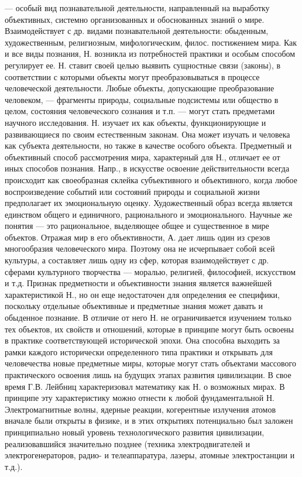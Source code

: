 \documentclass[a4paper,12pt]{article}
\begin{document}
— особый вид познавательной деятельности, направленный на выработку объективных, системно организованных и обоснованных знаний о мире. Взаимодействует с др. видами познавательной деятельности: обыденным, художественным, религиозным, мифологическим, филос. постижением мира. 
Как и все виды познания, Н. возникла из потребностей практики и особым способом регулирует ее. Н. ставит своей целью выявить сущностные связи (законы), в соответствии с которыми объекты могут преобразовываться в процессе человеческой деятельности. 
Любые объекты, допускающие преобразование человеком, — фрагменты природы, социальные подсистемы или общество в целом, состояния человеческого сознания и т.п. — могут стать предметами научного исследования. Н. изучает их как объекты, функционирующие и развивающиеся по своим естественным законам. Она может изучать и человека как субъекта деятельности, но также в качестве особого объекта. 
Предметный и объективный способ рассмотрения мира, характерный для Н., отличает ее от иных способов познания. Напр., в искусстве освоение действительности всегда происходит как своеобразная склейка субъективного и объективного, когда любое воспроизведение событий или состояний природы и социальной жизни предполагает их эмоциональную оценку. Художественный образ всегда является единством общего и единичного, рационального и эмоционального. Научные же понятия — это рациональное, выделяющее общее и существенное в мире объектов. 
Отражая мир в его объективности, А. дает лишь один из срезов многообразия человеческого мира. Поэтому она не исчерпывает собой всей культуры, а составляет лишь одну из сфер, которая взаимодействует с др. сферами культурного творчества — моралью, религией, философией, искусством и т.д. 
Признак предметности и объективности знания является важнейшей характеристикой Н., но он еще недостаточен для определения ее специфики, поскольку отдельные объективные и предметные знания может давать и обыденное познание. В отличие от него Н. не ограничивается изучением только тех объектов, их свойств и отношений, которые в принципе могут быть освоены в практике соответствующей исторической эпохи. Она способна выходить за рамки каждого исторически определенного типа практики и открывать для человечества новые предметные миры, которые могут стать объектами массового практического освоения лишь на будущих этапах развития цивилизации. В свое время Г.В. Лейбниц характеризовал математику как Н. о возможных мирах. В принципе эту характеристику можно отнести к любой фундаментальной Н. Электромагнитные волны, ядерные реакции, когерентные излучения атомов вначале были открыты в физике, и в этих открытиях потенциально был заложен принципиально новый уровень технологического развития цивилизации, реализовавшийся значительно позднее (техника электродвигателей и электрогенераторов, радио- и телеаппаратура, лазеры, атомные электростанции и т.д.). 
\end{document}
